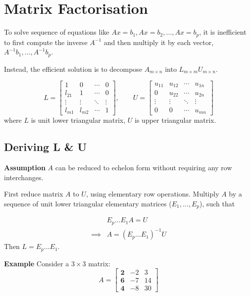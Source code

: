 \documentclass[../linear-algebra.tex]{subfiles}
\begin{document}
\newpage
\section{Matrix Factorisation}
To solve sequence of equations like $Ax=b_1, Ax=b_2,\ldots, Ax=b_p$,
it is inefficient to first compute the inverse $A^{-1}$ and then multiply it by each vector, $A^{-1}b_{1}, ..., A^{-1}b_{p}$.

\noindent Instead, the efficient solution is to decompose $A_{m \times n}$ into $L_{m \times m}U_{m \times n}$.

\[
L = \begin{bmatrix} 
1 & 0 & \cdots & 0 \\ 
l_{21} & 1 & \cdots & 0 \\ 
\vdots & \vdots & \ddots & \vdots \\ 
l_{m1} & l_{m2} & \cdots & 1 
\end{bmatrix},
\qquad
U = \begin{bmatrix} 
u_{11} & u_{12} & \cdots & u_{1n} \\ 
0 & u_{22} & \cdots & u_{2n} \\ 
\vdots & \vdots & \ddots & \vdots \\ 
0 & 0 & \cdots & u_{mn} 
\end{bmatrix}
\]
where $L$ is unit lower triangular matrix, $U$ is upper triangular matrix.

\subsection{Deriving L \& U}
\textbf{Assumption} $A$ can be reduced to echelon form without requiring any row interchanges.

\noindent First reduce matrix $A$ to $U$, using elementary row operations.
Multiply $A$ by a sequence of unit lower triangular elementary matrices ($E_{1}, \dots, E_{p}$), such that 

\begin{align*}
           & E_{p} \dots E_{1}A = U \\
  \implies & A = (E_{p} \dots E_{1})^{-1}U
\end{align*}
Then $L = E_{p} \dots E_{1}$.

\noindent\textbf{Example} Consider a $3 \times 3$ matrix:
\[
A = \begin{bmatrix} \mathbf{2} & -2 & 3 \\ \mathbf{6} & -7 & 14 \\ \mathbf{4} & -8 & 30 \end{bmatrix}
\]
\end{document}
